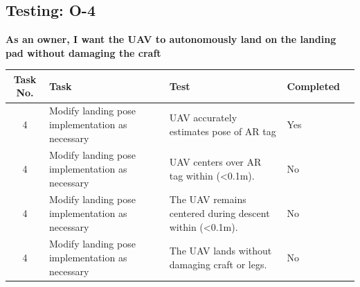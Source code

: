 \subsection{Testing: O-4}
\textbf{As an owner, I want the UAV to autonomously land on the landing pad without damaging the craft}\\
\begin{tabular}{| c | >{\raggedright}m{4cm} | m{4cm} | m{4cm} | m{4cm} |}\hline
	Task No. & Task & Test & Completed\\\hline
	4 & Modify landing pose implementation as necessary & UAV accurately estimates pose of AR tag & Yes\\\hline
	4 & Modify landing pose implementation as necessary & UAV centers over AR tag within (\textless 0.1m). & No\\\hline
	4 & Modify landing pose implementation as necessary & The UAV remains centered during descent within (\textless 0.1m). & No\\\hline
	4 & Modify landing pose implementation as necessary & The UAV lands without damaging craft or legs. & No\\\hline
\end{tabular}

